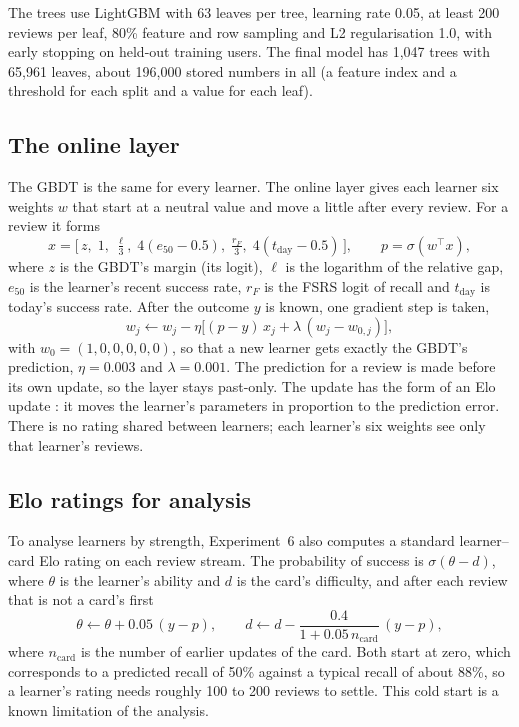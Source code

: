The trees use LightGBM \cite{ke2017lightgbm} with 63 leaves per tree, learning rate 0.05, at least 200 reviews per leaf,
80\% feature and row sampling and L2 regularisation 1.0, with early stopping on held-out training users. The final model has
1,047 trees with 65,961 leaves, about 196,000 stored numbers in all (a feature index and a threshold for each split and a
value for each leaf).

\subsection{The online layer}
\label{sec:method-online}

The GBDT is the same for every learner. The online layer gives each learner six weights $w$ that start at a neutral value and
move a little after every review. For a review it forms
\begin{equation}
  x = \Big[\, z,\; 1,\; \tfrac{\ell}{3},\; 4(e_{50} - 0.5),\; \tfrac{r_F}{3},\; 4(t_{\mathrm{day}} - 0.5) \,\Big],
  \qquad p = \sigma(w^{\top} x),
  \label{eq:online-design}
\end{equation}
where $z$ is the GBDT's margin (its logit), $\ell$ is the logarithm of the relative gap, $e_{50}$ is the learner's recent
success rate, $r_F$ is the FSRS logit of recall and $t_{\mathrm{day}}$ is today's success rate. After the outcome $y$ is
known, one gradient step is taken,
\begin{equation}
  w_j \leftarrow w_j - \eta \big[ (p - y)\, x_j + \lambda\, (w_j - w_{0,j}) \big],
  \label{eq:online-update}
\end{equation}
with $w_0 = (1, 0, 0, 0, 0, 0)$, so that a new learner gets exactly the GBDT's prediction, $\eta = 0.003$ and
$\lambda = 0.001$. The prediction for a review is made before its own update, so the layer stays past-only. The update has the
form of an Elo update \cite{pelanek2016elo}: it moves the learner's parameters in proportion to the prediction error. There is
no rating shared between learners; each learner's six weights see only that learner's reviews.

\subsection{Elo ratings for analysis}
\label{sec:method-elo}

To analyse learners by strength, Experiment~6 also computes a standard learner--card Elo rating on each review stream. The
probability of success is $\sigma(\theta - d)$, where $\theta$ is the learner's ability and $d$ is the card's difficulty, and
after each review that is not a card's first
\begin{equation}
  \theta \leftarrow \theta + 0.05\,(y - p), \qquad d \leftarrow d - \frac{0.4}{1 + 0.05\, n_{\mathrm{card}}}\,(y - p),
  \label{eq:elo}
\end{equation}
where $n_{\mathrm{card}}$ is the number of earlier updates of the card. Both start at zero, which corresponds to a predicted
recall of 50\% against a typical recall of about 88\%, so a learner's rating needs roughly 100 to 200 reviews to settle.
This cold start is a known limitation of the analysis.

